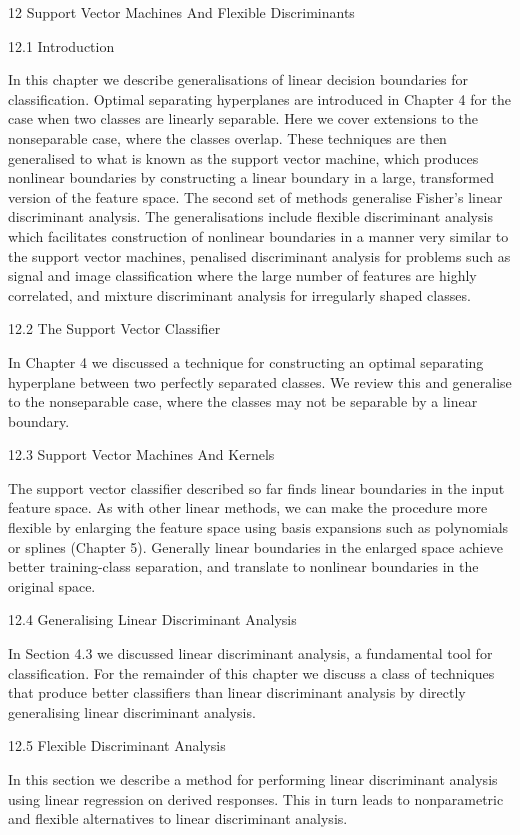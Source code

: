 12 Support Vector Machines And Flexible Discriminants

12.1 Introduction

In this chapter we describe generalisations of linear decision boundaries for classification. Optimal separating hyperplanes are introduced in Chapter 4 for the case when two classes are linearly separable. Here we cover extensions to the nonseparable case, where the classes overlap. These techniques are then generalised to what is known as the support vector machine, which produces nonlinear boundaries by constructing a linear boundary in a large, transformed version of the feature space. The second set of methods generalise Fisher's linear discriminant analysis. The generalisations include flexible discriminant analysis which facilitates construction of nonlinear boundaries in a manner very similar to the support vector machines, penalised discriminant analysis for problems such as signal and image classification where the large number of features are highly correlated, and mixture discriminant analysis for irregularly shaped classes.

12.2 The Support Vector Classifier

In Chapter 4 we discussed a technique for constructing an optimal separating hyperplane between two perfectly separated classes. We review this and generalise to the nonseparable case, where the classes may not be separable by a linear boundary.

12.3 Support Vector Machines And Kernels

The support vector classifier described so far finds linear boundaries in the input feature space. As with other linear methods, we can make the procedure more flexible by enlarging the feature space using basis expansions such as polynomials or splines (Chapter 5). Generally linear boundaries in the enlarged space achieve better training-class separation, and translate to nonlinear boundaries in the original space.

12.4 Generalising Linear Discriminant Analysis

In Section 4.3 we discussed linear discriminant analysis, a fundamental tool for classification. For the remainder of this chapter we discuss a class of techniques that produce better classifiers than linear discriminant analysis by directly generalising linear discriminant analysis.

12.5 Flexible Discriminant Analysis

In this section we describe a method for performing linear discriminant analysis using linear regression on derived responses. This in turn leads to nonparametric and flexible alternatives to linear discriminant analysis.

